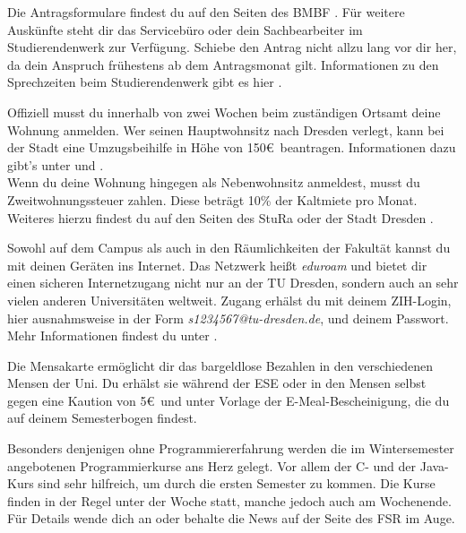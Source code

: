 \begin{itemize}[leftmargin=*]
Die Antragsformulare findest du auf den Seiten des BMBF
. Für weitere
Auskünfte steht dir das Servicebüro oder dein Sachbearbeiter im
Studierendenwerk zur Verfügung. Schiebe den Antrag nicht allzu lang vor dir
her, da dein Anspruch frühestens ab dem Antragsmonat gilt. Informationen zu den
Sprechzeiten beim Studierendenwerk gibt es hier
.

\newpage

Offiziell musst du innerhalb von zwei Wochen beim zuständigen Ortsamt
deine Wohnung anmelden. Wer seinen Hauptwohnsitz nach Dresden verlegt, kann bei
der Stadt eine \glqq{}Umzugsbeihilfe\grqq{} in Höhe von 150\euro\ beantragen.
Informationen dazu gibt's unter
 und
. \\
Wenn du deine Wohnung hingegen als Nebenwohnsitz anmeldest, musst du
Zweitwohnungssteuer zahlen. Diese beträgt 10\% der Kaltmiete pro Monat.
Weiteres hierzu findest du auf den Seiten des StuRa
 oder der Stadt
Dresden
.

Sowohl auf dem Campus als auch in den Räumlichkeiten der Fakultät kannst du mit
deinen Geräten ins Internet. Das Netzwerk heißt \textit{eduroam} und bietet dir
einen sicheren Internetzugang nicht nur an der TU Dresden, sondern auch an sehr
vielen anderen Universitäten weltweit. Zugang erhälst du mit deinem ZIH-Login,
hier ausnahmsweise in der Form \textit{s1234567@tu-dresden.de}, und deinem
Passwort. Mehr Informationen findest du unter
.

Die Mensakarte ermöglicht dir das bargeldlose Bezahlen in den verschiedenen
Mensen der Uni. Du erhälst sie während der ESE oder in den Mensen selbst gegen
eine Kaution von 5\euro\ und unter Vorlage der E-Meal-Bescheinigung, die du auf
deinem Semesterbogen findest.

Besonders denjenigen ohne Programmiererfahrung werden die im Wintersemester
angebotenen Programmierkurse ans Herz gelegt. Vor allem der C- und der Java-Kurs
sind sehr hilfreich, um durch die ersten Semester zu kommen. Die Kurse finden in
der Regel unter der Woche statt, manche jedoch auch am Wochenende. Für Details
wende dich an  oder behalte die News auf der
Seite des FSR  im Auge.


\end{itemize}
